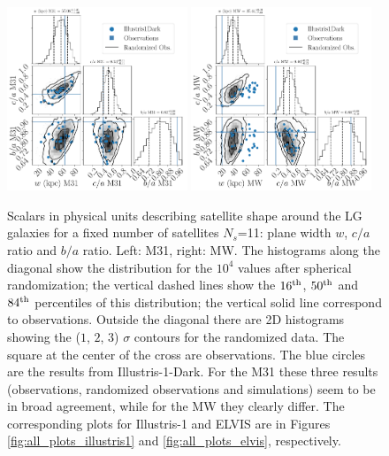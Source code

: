 \documentclass[a4paper,fleqn,usenatbib]{mnras}
\begin{document}
\begin{figure}
\centering
\includegraphics[width=0.48\textwidth]{input_illustris1dark_obs_M31_n_11.pdf}
\includegraphics[width=0.48\textwidth]{input_illustris1dark_obs_MW_n_11.pdf}
\caption{Scalars in physical units describing satellite shape around the LG galaxies for
  a fixed number of satellites $N_s$=11: 
  plane width $w$, $c/a$ ratio and $b/a$ ratio.
  Left: M31, right: MW. 
  The histograms along the diagonal show the distribution for the
  $10^4$ values after spherical randomization; the vertical dashed
  lines show the $16^{\rm th}$, $50^{\rm th}$ and $84^{\rm th}$
  percentiles of this distribution; the vertical solid line correspond
  to observations. 
  Outside the diagonal there are 2D histograms showing the ($1$, $2$,
  $3$) $\sigma$ contours for the randomized data.  
  The square at the center of the cross are observations.
  The blue circles are the results from Illustris-1-Dark. 
  For the M31 these three results
  (observations, randomized observations and simulations) seem to be
  in broad agreement, while for the MW they clearly differ. 
  The corresponding plots for Illustris-1 and ELVIS are
  in Figures \ref{fig:all_plots_illustris1} and
\ref{fig:all_plots_elvis}, respectively. \label{fig:physical_illustris1dark}}
\end{figure}
\end{document}
